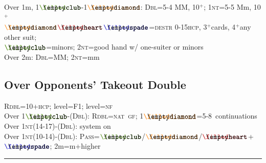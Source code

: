 \documentclass{article}
\newcommand\coloredsuitsymbol[3]{\ensuremath{\mathrel{\raisebox{-0.3pt}{{\color{#1}#2}\llap{#3}}}}}
\newcommand\suitsymbol[3]{\coloredsuitsymbol{#1}{#2}{#3}}%
\newcommand\C{\suitsymbol{clubcolor}{\filledclub}{\emptyclub}}
\newcommand\D{\suitsymbol{diamondcolor}{\filleddiamond}{\emptydiamond}}
\renewcommand\H{\suitsymbol{heartcolor}{\filledheart}{\emptyheart}}
\renewcommand\S{\suitsymbol{spadecolor}{\filledspade}{\emptyspade}}
\newcommand\N{\caps{nt}}
\newcommand\PASS{\caps{Pass}}
\newcommand\X{\caps{Dbl}}
\newcommand\XX{\caps{Rdbl}}
\newcommand\caps[1]{{\scshape#1}}
\newcommand\hcp{\caps{hcp}}
\newcommand\GF{\caps{gf}}
\newcommand\NF{\caps{nf}}
\newcommand\NAT{\caps{nat}}
\newcommand\more{\ensuremath{^+}}
\newcommand{\smallsection}[1]{\vspace{-1ex}\subsection*{#1}\raggedright}
\newcommand{\thinrule}{\rule{\textwidth}{\arrayrulewidth}}
\newcommand{\myendrule}{\vspace{-1.5ex}\thinrule}
\begin{document}
\begin{minipage}[t]{90mm}
	Over 1m, 1\C-1\D: \X=5-4 MM, 10\more; 1\N=5-5 Mm, 10\more\\
	\D\H\S=\caps{destr} 0-15\hcp, 3\more cards, 4\more any other suit;\\
	\C=minors; 2\N=good hand w/ one-suiter or minors\\
	Over 2m: \X=MM; 2\N=mm
\smallsection{Over Opponents' Takeout Double}
	\XX=10+\hcp;  level=F1;  level=\NF\\
	Over 1\C-(\X): \XX=\NAT\ \GF; 1\D=5-8\rightarrow\NAT\ continuations\\
	Over 1\N(14-17)-(\X): system on\\
	Over 1\N(10-14)-(\X): \PASS=\C/\D/\H+\S; 2m=m+higher\\
\myendrule
\end{minipage}
\hfill
\begin{minipage}[t]{90mm}

\end{minipage}
\end{document}
